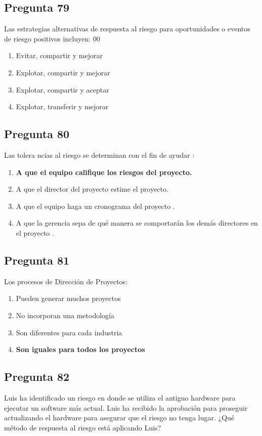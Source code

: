 \documentclass[11pt,a4paper]{article}
\begin{document}
\subsection*{Pregunta 79}
Las estrategias alternativas de respuesta al riesgo para oportunidades o eventos de riesgo positivos incluyen: 00

\begin{enumerate}[label=\alph*)]
  \item Evitar, compartir y mejorar
  \item Explotar, compartir y mejorar
  \item Explotar, compartir y aceptar
  \item Explotar, transferir y mejorar
\end{enumerate}

\subsection*{Pregunta 80}
Las tolera ncias al riesgo se determinan con el fin de ayudar :

\begin{enumerate}[label=\alph*)]
  \item \textbf{A que el equipo califique los riesgos del proyecto.}
  \item A que el director del proyecto estime el proyecto.
  \item A que el equipo haga un cronograma del proyecto .
  \item A que la gerencia sepa de qué manera se comportarán los demás directores en el proyecto .
\end{enumerate}

\subsection*{Pregunta 81}
Los procesos de Dirección de Proyectos:

\begin{enumerate}[label=\alph*)]
  \item Pueden generar muchos proyectos
  \item No incorporan una metodología
  \item Son diferentes para cada industria
  \item \textbf{Son iguales para todos los proyectos}
\end{enumerate}

\subsection*{Pregunta 82}
Luis ha identificado un riesgo en donde se utiliza el antiguo hardware para ejecutar un software más actual. Luis ha recibido la aprobación para proseguir actualizando el hardware para asegurar que el riesgo no tenga lugar. ¿Qué método de respuesta al riesgo está aplicando Luis?
\end{document}
